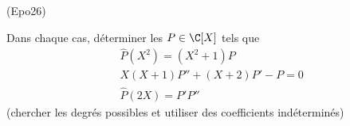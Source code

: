 \begin{tiny}(Epo26)\end{tiny} Dans chaque cas, déterminer les $P\in\C[X]$ tels que 
\begin{align*}
 &\widehat{P}(X^2) = (X^2+1)P\\
 &X(X+1)P''+(X+2)P'-P=0 \\
 &\widehat{P}(2X) = P'P''
\end{align*}
 (chercher les degrés possibles et utiliser des coefficients indéterminés)
